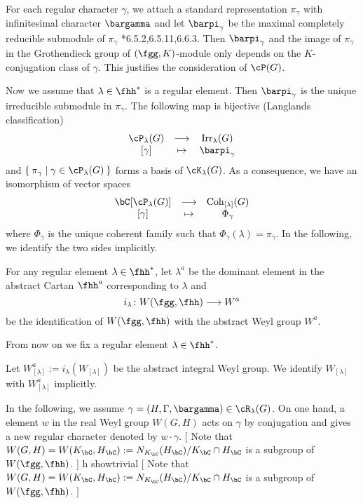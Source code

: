 \documentclass[12pt,a4paper]{amsart}
\newcommand{\trivial}[2][]{\if\relax\detokenize{#1}\relax
  {%
      \color{orange} \vspace{0em} $[$  #2 $]$
      \color{black}
  }
  \else
\ifx#1h
\ifcsname showtrivial\endcsname
{%
    \color{orange} \vspace{0em}  $[$ #2 $]$
    \color{black}
}
\fi
\else {\red Wrong argument!} \fi
\fi
}
\numberwithin{equation}{section}
\theoremstyle{remark}
\def\Irr{\mathrm{Irr}}
\def\Coh{\mathrm{Coh}}
\newcommand{\Grt}{\cK}
\begin{document}
For each regular character $\gamma$, we attach a standard representation
$\pi_\gamma$ with infinitesimal character $\bargamma$ and let $\barpi_\gamma$ be
the maximal completely reducible submodule of $\pi_\gamma$
\cite{Vg}*{6.5.2,6.5.11,6.6.3}. Then $\barpi_\gamma$ and the image of
$\pi_\gamma$ in the Grothendieck group of $(\fgg,K)$-module only depends on the
$K$-conjugation class of $\gamma$. This justifies the consideration of $\cP(G)$.


Now we assume that $\lambda\in \fhh^*$ is a regular element. Then
$\barpi_\gamma$ is the unique irreducible submodule in $\pi_\gamma$.
The following map is bijective (Langlands classification)
\[
  \begin{array}{ccc}
    \cP_{\lambda}(G) & \longrightarrow & \Irr_{\lambda}(G)\\
    {[\gamma]} & \mapsto & \barpi_{\gamma}
  \end{array}
\]
and $\Set{\pi_\gamma|\gamma\in \cP_{\lambda}(G)}$ forms a basis of
$\Grt_{\lambda}(G)$. As a consequence, we have an isomorphism of vector spaces
\[
  \begin{array}{ccc}
    \bC[\cP_{\lambda}(G)] & \longrightarrow & \Coh_{[\lambda]}(G)\\
    {[\gamma]} & \mapsto & \Phi_{\gamma}
  \end{array}
\]
where $\Phi_{\gamma}$ is the unique coherent family such that
$\Phi_{\gamma}(\lambda) = \pi_{\gamma}$.
In the following, we identify the two sides implicitly.

\medskip

\def\Wa{W^{a}}
\def\WiR{W_{i\bR}}
\def\fhhiR{\fhh_{i\bR}}
\def\WR{W_{\bR}}
\def\WC{W_{\bC}}
\def\lama{\lambda^{a}}
\def\Wlama{W^a_{[\lambda]}}
For any
regular element $\lambda\in \fhh^{*}$, let $\lambda^{a}$ be the dominant element
in the abstract Cartan $\fhh^{a}$ corresponding to $\lambda$ and
\[
  i_{\lambda}\colon W(\fgg,\fhh)\longrightarrow \Wa
\]
be the identification of $W(\fgg,\fhh)$ with the abstract Weyl group $\Wa$.

From now on we fix a regular element $\lambda \in \fhh^{*}$.

Let $\Wlama:= i_{\lambda}(W_{[\lambda]})$ be the abstract integral Weyl group.
We identify $W_{[\lambda]}$ with $\Wlama$ implicitly.

In the following, we
assume $\gamma=(H,\Gamma,\bargamma)\in \cR_{\lambda}(G)$. On one hand, a element
$w$ in the real Weyl group $W(G,H)$ acts on $\gamma$ by conjugation and gives a
new regular character denoted by $w\cdot \gamma$. \trivial{ Note that
  $W(G,H) = W(K_{\bC},H_{\bC}):= N_{K_{\bC}}(H_{\bC})/K_{\bC}\cap H_{\bC}$ is a
  subgroup of $W(\fgg,\fhh)$. }
\end{document}
